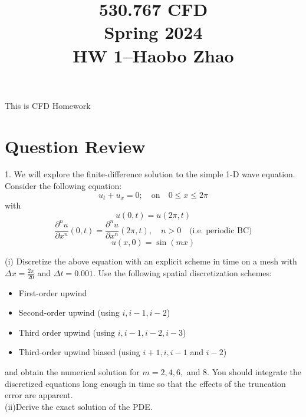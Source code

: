 \documentclass[12pt]{article}
\begin{document}
\title{530.767 CFD\\Spring 2024\\HW 1–Haobo Zhao}
\maketitle



This is CFD Homework




\tableofcontents


\section{Question Review}

1. We will explore the finite-difference solution to the 
simple 1-D wave equation.
Consider the following equation:
\begin{equation}
    u_t + u_x = 0; \quad \text{on} \quad 0 \leq x \leq 2\pi
\end{equation}
with
    $$u(0,t) = u(2\pi,t)$$
    $$\frac{\partial^n u}{\partial x^n} (0,t) = \frac{\partial^n u}{\partial x^n} (2\pi,t), \quad n > 0 \quad \text{(i.e. periodic BC)}$$ 
    $$u(x,0) = \sin(mx)$$

(i) Discretize the above equation with an explicit scheme 
in time on a mesh with \( \Delta x = \frac{2\pi}{20} \) 
and \( \Delta t = 0.001 \).
Use the following spatial discretization schemes:
\begin{itemize}
    \item First-order upwind
    \item Second-order upwind (using \(i, i-1, i-2\))
    \item Third order upwind (using \(i, i-1, i-2, i-3\))
    \item Third-order upwind biased (using \(i+1, i, i-1\) 
    and \(i-2\))
\end{itemize}
and obtain the numerical solution for \(m=2, 4, 6,\) 
and \(8\). You should integrate the discretized equations long 
enough in time so that the effects of the truncation error are 
apparent.\\

(ii)Derive the exact solution of the PDE.\\
\end{document}

